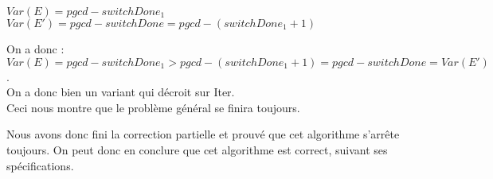 $Var(E) = pgcd - switchDone_{1}$
$Var(E') = pgcd - switchDone = pgcd - (switchDone_{1}+1)$

On a donc : $Var(E) = pgcd - switchDone_{1} > pgcd - (switchDone_1 +1) = pgcd - switchDone = Var(E')$.\\

On a donc bien un variant qui décroit sur Iter.\\

Ceci nous montre que le problème général se finira toujours. 

Nous avons donc fini la correction partielle et prouvé que cet algorithme s'arrête toujours. On peut donc en conclure que cet algorithme est correct, suivant ses spécifications. \\